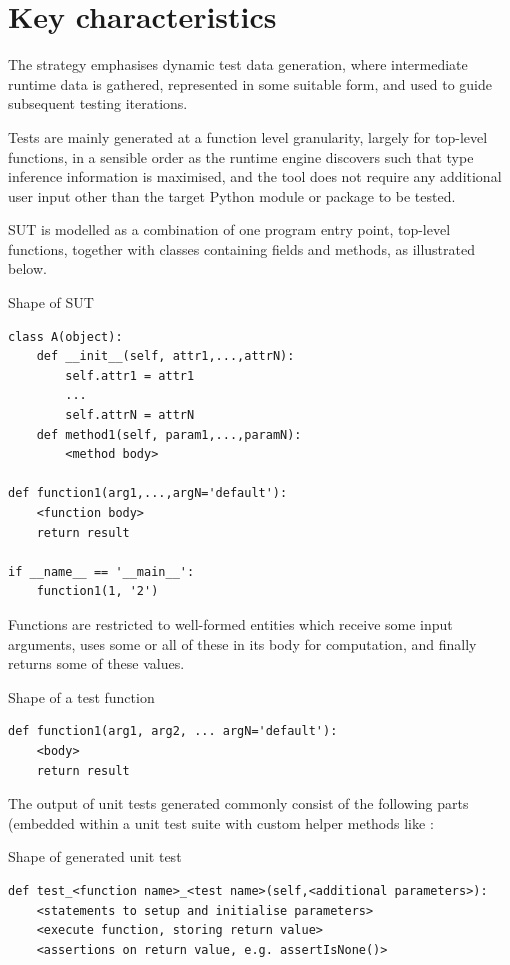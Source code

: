 \documentclass{icldt}
\numberwithin{equation}{section}       %
\begin{document}
{\section{Key characteristics}
The strategy emphasises dynamic test data generation, where intermediate runtime data is gathered, represented in some suitable form, and used to guide subsequent testing iterations.

Tests are mainly generated at a function level granularity, largely for top-level functions, in a sensible order as the runtime engine discovers such that type inference information is maximised, and the tool does not require any additional user input other than the target Python module or package to be tested.

SUT is modelled as a combination of one  program entry point, top-level functions, together with classes containing fields and methods, as illustrated below. 

\begin{listing}[H]
	\caption{Shape of SUT}
	\begin{verbatim}
class A(object):
	def __init__(self, attr1,...,attrN):
		self.attr1 = attr1
		...
		self.attrN = attrN
	def method1(self, param1,...,paramN):
		<method body>

def function1(arg1,...,argN='default'):
	<function body>
	return result

if __name__ == '__main__':
	function1(1, '2')
	\end{verbatim}
	\label{lst:py-model-program}
\end{listing}

Functions are restricted to well-formed entities which receive some input arguments, uses some or all of these in its body for computation, and finally returns some of these values.
\begin{listing}[H]
	\caption{Shape of a test function}
	\begin{verbatim}
def function1(arg1, arg2, ... argN='default'):
	<body>
	return result
	\end{verbatim}
	\label{lst:py-model-function}
\end{listing}

The output of unit tests generated commonly consist of the following parts (embedded within a unit test suite with custom helper methods like :
\begin{listing}[H]
	\caption{Shape of generated unit test}
	\begin{verbatim}
def test_<function name>_<test name>(self,<additional parameters>):
	<statements to setup and initialise parameters>
	<execute function, storing return value>
	<assertions on return value, e.g. assertIsNone()>
	\end{verbatim}
	\label{lst:py-model-function}
\end{listing}

}
\end{document}
